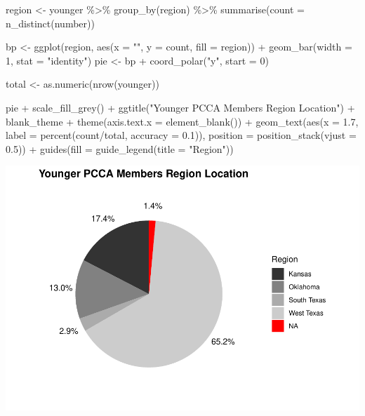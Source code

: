 \documentclass[
]{article}
\newenvironment{Shaded}{\begin{snugshade}}{\end{snugshade}}
\newcommand{\AttributeTok}[1]{\textcolor[rgb]{0.77,0.63,0.00}{#1}}
\newcommand{\DecValTok}[1]{\textcolor[rgb]{0.00,0.00,0.81}{#1}}
\newcommand{\FloatTok}[1]{\textcolor[rgb]{0.00,0.00,0.81}{#1}}
\newcommand{\FunctionTok}[1]{\textcolor[rgb]{0.00,0.00,0.00}{#1}}
\newcommand{\NormalTok}[1]{#1}
\newcommand{\OtherTok}[1]{\textcolor[rgb]{0.56,0.35,0.01}{#1}}
\newcommand{\SpecialCharTok}[1]{\textcolor[rgb]{0.00,0.00,0.00}{#1}}
\newcommand{\StringTok}[1]{\textcolor[rgb]{0.31,0.60,0.02}{#1}}
\begin{document}
\begin{Shaded}
\begin{Highlighting}[]
\NormalTok{region }\OtherTok{\textless{}{-}}\NormalTok{ younger }\SpecialCharTok{\%\textgreater{}\%}
    \FunctionTok{group\_by}\NormalTok{(region) }\SpecialCharTok{\%\textgreater{}\%}
    \FunctionTok{summarise}\NormalTok{(}\AttributeTok{count =} \FunctionTok{n\_distinct}\NormalTok{(number))}

\NormalTok{bp }\OtherTok{\textless{}{-}} \FunctionTok{ggplot}\NormalTok{(region, }\FunctionTok{aes}\NormalTok{(}\AttributeTok{x =} \StringTok{""}\NormalTok{, }\AttributeTok{y =}\NormalTok{ count, }\AttributeTok{fill =}\NormalTok{ region)) }\SpecialCharTok{+}
    \FunctionTok{geom\_bar}\NormalTok{(}\AttributeTok{width =} \DecValTok{1}\NormalTok{, }\AttributeTok{stat =} \StringTok{"identity"}\NormalTok{)}
\NormalTok{pie }\OtherTok{\textless{}{-}}\NormalTok{ bp }\SpecialCharTok{+} \FunctionTok{coord\_polar}\NormalTok{(}\StringTok{"y"}\NormalTok{, }\AttributeTok{start =} \DecValTok{0}\NormalTok{)}

\NormalTok{total }\OtherTok{\textless{}{-}} \FunctionTok{as.numeric}\NormalTok{(}\FunctionTok{nrow}\NormalTok{(younger))}

\NormalTok{pie }\SpecialCharTok{+} \FunctionTok{scale\_fill\_grey}\NormalTok{() }\SpecialCharTok{+} \FunctionTok{ggtitle}\NormalTok{(}\StringTok{"Younger PCCA Members Region Location"}\NormalTok{) }\SpecialCharTok{+}
\NormalTok{    blank\_theme }\SpecialCharTok{+} \FunctionTok{theme}\NormalTok{(}\AttributeTok{axis.text.x =} \FunctionTok{element\_blank}\NormalTok{()) }\SpecialCharTok{+} \FunctionTok{geom\_text}\NormalTok{(}\FunctionTok{aes}\NormalTok{(}\AttributeTok{x =} \FloatTok{1.7}\NormalTok{,}
    \AttributeTok{label =} \FunctionTok{percent}\NormalTok{(count}\SpecialCharTok{/}\NormalTok{total, }\AttributeTok{accuracy =} \FloatTok{0.1}\NormalTok{)), }\AttributeTok{position =} \FunctionTok{position\_stack}\NormalTok{(}\AttributeTok{vjust =} \FloatTok{0.5}\NormalTok{)) }\SpecialCharTok{+}
    \FunctionTok{guides}\NormalTok{(}\AttributeTok{fill =} \FunctionTok{guide\_legend}\NormalTok{(}\AttributeTok{title =} \StringTok{"Region"}\NormalTok{))}
\end{Highlighting}
\end{Shaded}

\includegraphics{pcca_survey_files/figure-latex/region-young-1.pdf}
\end{document}
